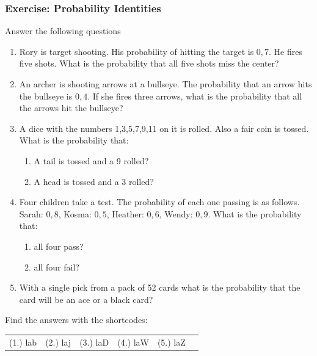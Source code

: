             \subsubsection{ Exercise: Probability Identities
}
            \nopagebreak
      \label{m39377*id114484}Answer the following questions \par 
      \label{m39377*id114495}\begin{enumerate}[noitemsep, label=\textbf{\arabic*}. ] 
            \label{m39377*uid60}\item Rory is target shooting. His probability of hitting the target is
$0,7$. He fires five shots. What is the probability
that all five shots miss the center?\newline
            \label{m39377*uid63}\item An archer is shooting arrows at a bullseye. The
probability that an arrow hits the bullseye is
$0,4$. If she fires three arrows, what is the
probability that all the arrows hit the bullseye?\newline
            \label{m39377*uid66}\item A dice with the numbers 1,3,5,7,9,11 on it is rolled.
Also a fair coin is tossed. What is the probability that:
\label{m39377*id114596}\begin{enumerate}[noitemsep, label=\textbf{\alph*}. ] 
            \label{m39377*uid69}\item A tail is tossed and a 9 rolled?
\label{m39377*uid70}\item A head is tossed and a 3 rolled?
\end{enumerate}
                \label{m39377*uid71}\item Four children take a test. The probability of each one
passing is as follows. Sarah: $0,8$, Kosma:
$0,5$, Heather: $0,6$,
Wendy: $0,9$. What is the probability that:
\label{m39377*id114667}\begin{enumerate}[noitemsep, label=\textbf{\alph*}. ] 
            \label{m39377*uid72}\item all four pass?
\label{m39377*uid73}\item all four fail?
\end{enumerate}
                \label{m39377*uid75}\item With a single pick from a pack of 52 cards what is the
probability that the card will be an ace or a black card?\newline
\end{enumerate}
    \label{m39377*cid8}
\par {} Find the answers with the shortcodes:
 \par \begin{tabular}[h]{cccccc}
 (1.) lab  &  (2.) laj  &  (3.) laD  &  (4.) laW  &  (5.) laZ  & \end{tabular}
